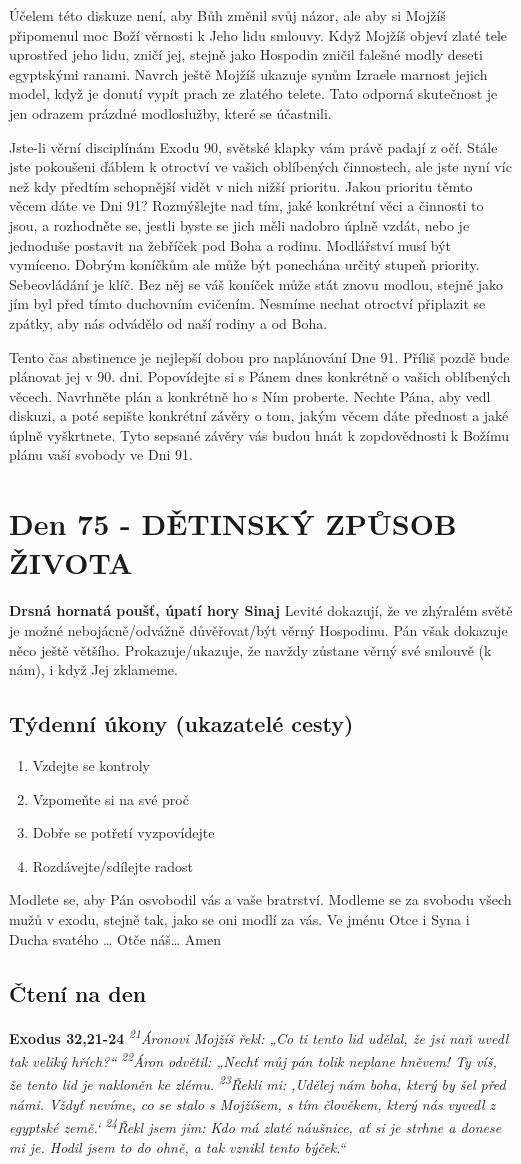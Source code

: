 \documentclass[11pt]{article}
\newcommand{\zacatekJedenactyTyden}{
\textbf{Drsná hornatá poušť, úpatí hory Sinaj} \newline 
Levité dokazují, že ve zhýralém světě je možné nebojácně/odvážně důvěřovat/být věrný Hospodinu. Pán však dokazuje něco ještě většího. Prokazuje/ukazuje, že navždy zůstane věrný své smlouvě (k nám), i když Jej zklameme.

\subsection*{Týdenní úkony (ukazatelé cesty)}
\begin{enumerate}
  \item Vzdejte se kontroly
  \item Vzpomeňte si na své proč
  \item Dobře se potřetí vyzpovídejte
  \item Rozdávejte/sdílejte radost
\end{enumerate}
Modlete se, aby Pán osvobodil vás a vaše bratrství. \newline
Modleme se za svobodu všech mužů v exodu, stejně tak, jako se oni modlí za vás.\newline
Ve jménu Otce i Syna i Ducha svatého …  Otče náš… Amen
}
\begin{document}
Účelem této diskuze není, aby Bůh změnil svůj názor, ale aby si Mojžíš připomenul moc Boží věrnosti k Jeho lidu smlouvy. Když
Mojžíš objeví zlaté tele uprostřed jeho lidu, zničí jej, stejně jako Hospodin zničil falešné modly deseti egyptskými ranami. Navrch
ještě Mojžíš ukazuje synům Izraele marnost jejich model, když je donutí vypít prach ze zlatého telete. Tato odporná skutečnost je
jen odrazem prázdné modloslužby, které se účastnili.

Jste-li věrní disciplínám Exodu 90, světské klapky vám právě padají z očí. Stále jste pokoušeni ďáblem k otroctví ve vašich
oblíbených činnostech, ale jste nyní víc než kdy předtím schopnější vidět v nich nižší prioritu. Jakou prioritu těmto věcem dáte ve
Dni 91? Rozmýšlejte nad tím, jaké konkrétní věci a činnosti to jsou, a rozhodněte se, jestli byste se jich měli nadobro úplně vzdát,
nebo je jednoduše postavit na žebříček pod Boha a rodinu. Modlářství musí být vymíceno. Dobrým koníčkům ale může být
ponechána určitý stupeň priority. Sebeovládání je klíč. Bez něj se váš koníček může stát znovu modlou, stejně jako jím byl před
tímto duchovním cvičením. Nesmíme nechat otroctví připlazit se zpátky, aby nás odvádělo od naší rodiny a od Boha.

Tento čas abstinence je nejlepší dobou pro naplánování Dne 91. Příliš pozdě bude plánovat jej v 90. dni. Popovídejte si s Pánem
dnes konkrétně o vašich oblíbených věcech. Navrhněte plán a konkrétně ho s Ním proberte. Nechte Pána, aby vedl diskuzi, a poté
sepište konkrétní závěry o tom, jakým věcem dáte přednost a jaké úplně vyškrtnete. Tyto sepsané závěry vás budou hnát
k zopdovědnosti k Božímu plánu vaší svobody ve Dni 91.



\newpage
\section{Den 75 - DĚTINSKÝ ZPŮSOB ŽIVOTA}
\zacatekJedenactyTyden
\subsection*{Čtení na den}
\textbf{Exodus 32,21-24}
\newline
\textit{
\textsuperscript{21}Áronovi Mojžíš řekl: „Co ti tento lid udělal, že jsi naň uvedl tak veliký hřích?“
\textsuperscript{22}Áron odvětil: „Nechť můj pán tolik neplane hněvem! Ty víš, že tento lid je nakloněn ke zlému.
\textsuperscript{23}Řekli mi: ‚Udělej nám boha, který by šel před námi. Vždyť nevíme, co se stalo s Mojžíšem, s tím člověkem, který nás vyvedl z egyptské země.‘
\textsuperscript{24}Řekl jsem jim: Kdo má zlaté náušnice, ať si je strhne a donese mi je. Hodil jsem to do ohně, a tak vznikl tento býček.“  
}
\end{document}
